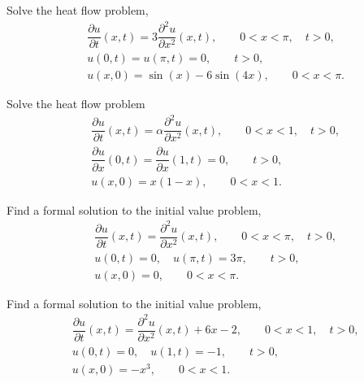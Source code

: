 \documentclass[11pt]{article}
\begin{document}
\makelabtitle


\begin{problem}
Solve the heat flow problem,
\begin{equation*} 
\begin{split}
& \dfrac{\partial u }{\partial t } (x,t) = 3 \dfrac{\partial^2 u}{\partial x^2}(x,t), \qquad 0<x<\pi, \quad t>0, \\
& u(0,t) = u(\pi,t)=0, \qquad t>0, \\
& u(x,0) = \sin(x)-6 \sin(4x), \qquad 0<x<\pi.
\end{split}
\end{equation*}
\end{problem}




\begin{problem}
Solve the heat flow problem
\begin{equation*} \begin{split}
& \dfrac{\partial u }{\partial t } (x,t) = \alpha \dfrac{\partial^2 u}{\partial x^2}(x,t), \qquad 0<x<1, \quad t>0, \\
& \dfrac{\partial u }{\partial x } (0,t) = \dfrac{\partial u }{\partial x } (1,t)=0, \qquad t>0, \\
& u(x,0) = x(1-x), \qquad 0<x<1.
\end{split}\end{equation*}
\end{problem}


\begin{problem}
Find a formal solution to the initial value problem,
\begin{equation*} \begin{split}
& \dfrac{\partial u }{\partial t } (x,t) = \dfrac{\partial^2 u}{\partial x^2}(x,t), \qquad 0<x<\pi, \quad t>0, \\
& u(0,t) = 0, \quad u(\pi,t)= 3\pi, \qquad t>0, \\
& u(x,0) = 0, \qquad 0<x<\pi.
\end{split}\end{equation*}
\end{problem}


\begin{problem}
Find a formal solution to the initial value problem,
\begin{equation*} \begin{split}
& \dfrac{\partial u }{\partial t } (x,t) = \dfrac{\partial^2 u}{\partial x^2}(x,t) + 6 x -2, \qquad 0<x<1, \quad t>0, \\
& u(0,t) = 0, \quad u(1,t)= -1, \qquad t>0, \\
& u(x,0) = -x^{3}, \qquad 0<x<1.
\end{split}\end{equation*}
\end{problem}
\end{document}

